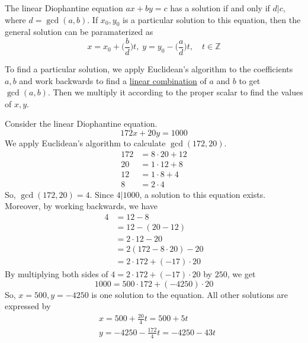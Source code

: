 \documentclass{article}
\newcounter{theorem}[section]
\newcounter{example}[section]
\begin{document}
\begin{theorem}
  \label{thm:solvability-of-linear-diophantine-equations}
The linear Diophantine equation $ax + by = c$ has a solution if and only if $d|c$, where $d = \gcd(a, b)$. If $x_0, y_0$ is a particular solution to this equation, then the general solution can be paramaterized as
\begin{equation}
  x = x_0 + \Big(\frac{b}{d} \Big) t, \; y = y_0 - \Big( \frac{a}{d} \Big) t, \quad t \in \mathbb{Z}
\end{equation}
\end{theorem}

To find a particular solution, we apply Euclidean's algorithm to the coefficients $a, b$ and work backwards to find a \hyperref[lin-def:linear-combination]{linear combination} of $a$ and $b$ to get $\gcd(a, b)$. Then we multiply it according to the proper scalar to find the values of $x, y$. 

\begin{example}
  \label{ex:solving-a-linear-diophantine-equation}
Consider the linear Diophantine equation. 
\begin{equation}
  172x + 20y = 1000
\end{equation}
We apply Euclidean's algorithm to calculate $\gcd(172, 20)$. 
\begin{align*}
    172 & = 8 \cdot 20 + 12 \\
    20 & = 1 \cdot 12 + 8 \\
    12 & = 1 \cdot 8 + 4 \\
    8 & = 2 \cdot 4
\end{align*}
So, $\gcd(172, 20) = 4$. Since $4|1000$, a solution to this equation exists. Moreover, by working backwards, we have
\begin{align*}
    4 &  = 12 - 8 \\
    & = 12 - (20 - 12) \\
    & = 2 \cdot 12 - 20 \\
    & = 2 (172 - 8 \cdot 20) - 20 \\
    & = 2 \cdot 172 + (-17) \cdot 20
\end{align*}
By multiplying both sides of $4 = 2 \cdot 172 + (-17) \cdot 20$ by $250$, we get 
\begin{equation}
  1000 = 500 \cdot 172 + (-4250) \cdot 20
\end{equation}
So, $x = 500, y = -4250$ is one solution to the equation. All other solutions are expressed by 
\begin{align*}
    &x = 500 + \frac{20}{4} t = 500 + 5t \\
    &y = -4250 - \frac{172}{4} t = -4250 - 43t
\end{align*}
\end{example}
\end{document}

